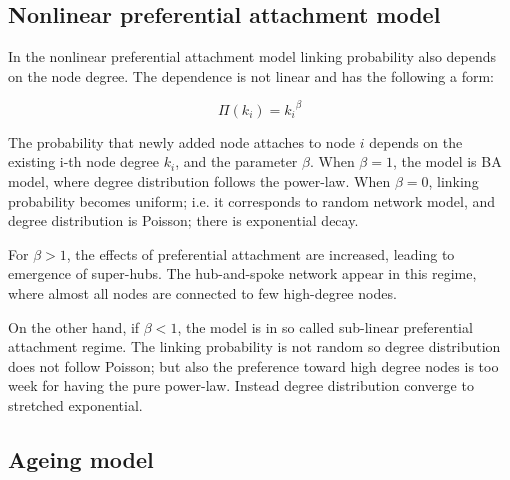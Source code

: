 
\subsection{Nonlinear preferential attachment model}

In the nonlinear preferential attachment model linking probability also depends on the node degree. The dependence is not linear and has the following a form:

\begin{equation}
\Pi(k_i) = {k_i}^{\beta}
\end{equation} 

The probability that newly added node attaches to node $i$ depends on the existing i-th node degree $k_i$, and the parameter $\beta$. When $\beta=1$, the model is BA model, where degree distribution follows the power-law. When $\beta=0$, linking probability becomes uniform; i.e. it corresponds to random network model, and degree distribution is Poisson; there is exponential decay. 

For $\beta>1$, the effects of preferential attachment are increased, leading to emergence of super-hubs. The hub-and-spoke network appear in this regime, where almost all nodes are connected to few high-degree nodes. %

On the other hand, if $\beta<1$, the model is in so called sub-linear preferential attachment regime. The linking probability is not random so degree distribution does not follow Poisson; but also the preference toward high degree nodes is too week for having the pure power-law. Instead degree distribution converge to stretched exponential.



\subsection{Ageing model}

